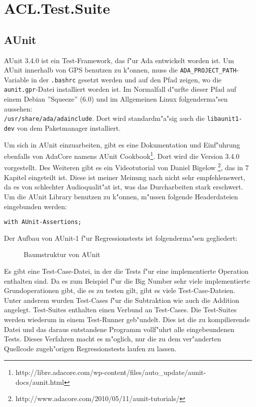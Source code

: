 \chapter{ACL.Test.Suite}
\section{AUnit} 
AUnit  3.4.0  ist ein Test-Framework, das f"ur Ada entwickelt worden ist.
Um AUnit innerhalb von GPS benutzen zu k"onnen, muss die
{\tt ADA\_PROJECT\_PATH}-Variable in der {\tt .bashrc} gesetzt werden
und auf den Pfad zeigen, wo die {\tt aunit.gpr}-Datei installiert
worden ist.  Im Normalfall d"urfte dieser Pfad auf einem Debian
''Squeeze'' (6.0) und im Allgemeinen Linux folgenderma"sen aussehen:
\\{\tt /usr/share/ada/adainclude}.  Dort wird standardm"a"sig auch die
  {\tt libaunit1-dev} von dem Paketmanager installiert.

Um sich in AUnit einzuarbeiten, gibt es eine Dokumentation und
Einf"uhrung ebenfalls von AdaCore namens AUnit
Cookbook\footnote{http://libre.adacore.com/wp-content/files/auto\_update/aunit-docs/aunit.html}.
Dort wird die Version 3.4.0 vorgestellt.  Des Weiteren gibt es ein
Videotutorial von Daniel
Bigelow \footnote{http://www.adacore.com/2010/05/11/aunit-tutorials/},
das in 7 Kapitel eingeteilt ist. Diese ist meiner Meinung nach nicht
sehr empfehlenswert, da es von schlechter Audioqualit"at ist, was das
Durcharbeiten stark erschwert.\\

Um die AUnit Library benutzen zu k"onnen, m"ussen folgende
Headerdateien eingebunden werden:

\begin{lstlisting}
with AUnit-Assertions; 
\end{lstlisting}

Der Aufbau von AUnit-1 f"ur Regressionstests ist folgenderma"sen gegliedert:\\

\begin{figure}[htp]
\centering
\caption{Baumstruktur von AUnit}
\label{}
\end{figure}

Es gibt eine Test-Case-Datei, in der die Tests f"ur eine
implementierte Operation enthalten sind.  Da es zum Beispiel f"ur die
Big Number sehr viele implementierte Grundoperationen gibt, die es zu
testen gilt, gibt es viele Test-Case-Dateien.  Unter anderem wurden
Test-Cases f"ur die Subtraktion wie auch die Addition angelegt.
Test-Suites enthalten einen Verbund an Test-Cases.  Die Test-Suites
werden wiederum in einem Test-Runner geb"undelt.  Dies ist die zu
kompilierende Datei und das daraus entstandene Programm vollf"uhrt
alle eingebeundenen Tests.  Dieses Verfahren macht es m"oglich, nur
die zu dem ver"anderten Quellcode zugeh"origen Regressionstests laufen
zu lassen.

